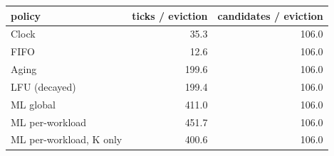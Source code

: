 \begin{tabular}{lrr}
\toprule
policy & ticks / eviction & candidates / eviction \\
\midrule
Clock & 35.3 & 106.0 \\
FIFO & 12.6 & 106.0 \\
Aging & 199.6 & 106.0 \\
LFU (decayed) & 199.4 & 106.0 \\
ML global & 411.0 & 106.0 \\
ML per-workload & 451.7 & 106.0 \\
ML per-workload, K only & 400.6 & 106.0 \\
\bottomrule
\end{tabular}
